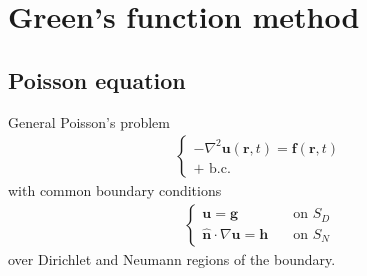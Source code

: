 \documentclass[letterpaper,10pt,english]{jupyterBook}
\begin{document}
\chapter{Green’s function method}
\label{\detokenize{ch/green-function:green-s-function-method}}\label{\detokenize{ch/green-function:classical-electromagnetism-green-function}}\label{\detokenize{ch/green-function::doc}}

\section{Poisson equation}
\label{\detokenize{ch/green-function:poisson-equation}}
\sphinxAtStartPar
General Poisson’s problem
\begin{equation*}
\begin{split}\begin{cases}
  - \nabla^2 \mathbf{u}(\mathbf{r}, t) = \mathbf{f}(\mathbf{r},t) \\
  \text{+ b.c.}
\end{cases}\end{split}
\end{equation*}
\sphinxAtStartPar
with common boundary conditions
\begin{equation*}
\begin{split}\begin{cases}
\mathbf{u} = \mathbf{g} & \quad \text{on $S_D$} \\
\hat{\mathbf{n}} \cdot \nabla \mathbf{u} = \mathbf{h} & \quad \text{on $S_N$}
\end{cases}\end{split}
\end{equation*}
\sphinxAtStartPar
over Dirichlet and Neumann regions of the boundary.
\end{document}
